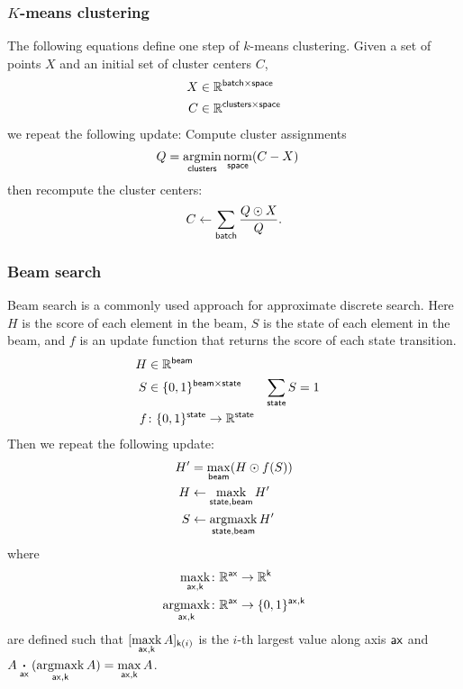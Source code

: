 \documentclass{article}
\newcommand{\reals}{\mathbb{R}}
\begin{document}
\subsubsection{$K$-means clustering}

The following equations define one step of $k$-means clustering. Given a set of points $X$ and an initial set of cluster centers $C$,
\begin{align*}
  X &\in \reals^{\name{batch} \times \name{space}} \\
C &\in \reals^{\name{clusters} \times \name{space}}
\end{align*}
we repeat the following update: Compute cluster assignments
\begin{align*}
Q &= \nfun{clusters}{argmin} \nfun{space}{norm}(C-X)
\end{align*}
then recompute the cluster centers:
\begin{equation*}
C \leftarrow \nsum{batch} \frac{Q \odot X}{Q}.
\end{equation*}

\subsubsection{Beam search}

Beam search is a commonly used approach for approximate discrete search. Here $H$ is the score of each element in the beam, $S$ is the state of each element in the beam, and $f$ is an update function that returns the score of each state transition. 
\begin{align*} 
H &\in \reals^{\name{beam}} \\
S &\in \{0, 1\}^{\name{beam} \times \name{state}} & \nsum{state} S &= 1 \\
f &\colon \{0, 1\}^{\name{state}} \rightarrow \reals^{\name{state}} \\
\end{align*}
Then we repeat the following update:
\begin{align*}
H' &= \nfun{beam}{max} (H \odot f(S)) \\
H &\leftarrow \nfun{state,beam}{maxk} H' \\
S &\leftarrow \nfun{state,beam}{argmaxk} H'
\end{align*}
where
\begin{align*}
\nfun{ax,k}{maxk} \colon \reals^{\name{ax}} &\rightarrow \reals^{\name{k}} \\
\nfun{ax,k}{argmaxk} \colon \reals^{\name{ax}} &\rightarrow \{0,1\}^{\name{ax},\name{k}}
\end{align*}
are defined such that $[\nfun{ax,k}{maxk} A]_{\nidx{k}{i}}$ is the $i$-th largest value along axis $\name{ax}$ and $A \ndot{ax} (\nfun{ax,k}{argmaxk}{A}) = \nfun{ax,k}{max} A$.
\end{document}
